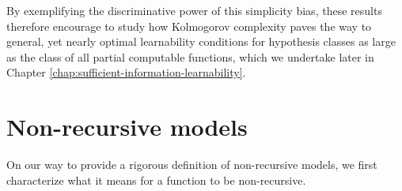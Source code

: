 By exemplifying the discriminative power of this simplicity bias, these results therefore encourage to study how Kolmogorov complexity paves the way to general, yet nearly optimal learnability conditions for hypothesis classes as large as the class of all partial computable functions, which we undertake later in Chapter \ref{chap:sufficient-information-learnability}.

\section{Non-recursive models}
\label{sec:non-recursive-models}
On our way to provide a rigorous definition of non-recursive models, we first characterize what it means for a function to be non-recursive.




